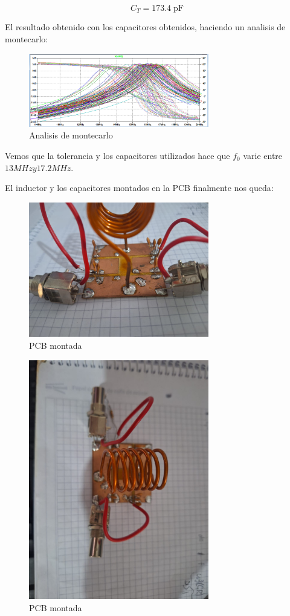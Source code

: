 \begin{equation}
    C_T = 173.4 \; \text{pF}
\end{equation}

El resultado obtenido con los capacitores obtenidos, haciendo un analisis de montecarlo:

\begin{figure}[h]
    \centering
    \includegraphics[width=0.7\textwidth]{Imagenes/montecarlo.png}
    \caption{Analisis de montecarlo}
\end{figure}

Vemos que la tolerancia y los capacitores utilizados hace que $f_0$ varie entre $13 MHz y 17.2 MHz$.


El inductor y los capacitores montados en la PCB finalmente nos queda:

\begin{figure}[h]
    \centering
    \includegraphics[width=0.7\textwidth]{Imagenes/pcb1.jpeg}
    \caption{PCB montada}
\end{figure}

\begin{figure}[h]
    \centering
    \includegraphics[width=0.7\textwidth]{Imagenes/pcb2.jpeg}
    \caption{PCB montada}
\end{figure}

